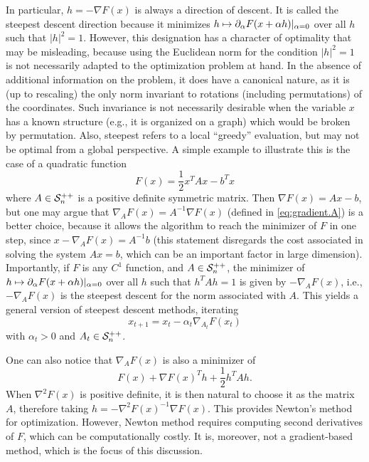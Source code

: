 In particular,  $h = -\nabla F(x)$ is always a direction of descent. It is called the steepest descent direction because it minimizes $h\mapsto \partial_\alpha F(x+\alpha h)|_{\alpha = 0}$ over all $h$ such that $|h|^2=1$. However, this designation has a character of optimality that may be misleading, because using the Euclidean norm for the condition $|h|^2 = 1$ is not necessarily adapted to the optimization problem at hand. In the absence of additional information on the problem, it does have a canonical nature, as it is (up to rescaling) the only norm invariant to rotations (including permutations) of the coordinates. Such invariance is not necessarily desirable when the variable $x$ has a known structure (e.g., it is organized on a graph) which would be broken by permutation. Also, steepest refers to a local ``greedy'' evaluation, but may not be optimal from a global perspective. A simple example to illustrate this is the case of a quadratic function
\[
F(x) = \frac12 x^T A x - b^T x
\]
where $A \in {\mathcal S}^{++}_n$ is a positive definite symmetric matrix. Then $\nabla F(x) = Ax - b$, but one may argue that $\nabla_A F(x) = A^{-1} \nabla F(x)$ (defined in \cref{eq:gradient.A}) is a better choice, because it allows the algorithm to reach the minimizer of $F$ in one step, since $x - \nabla_AF(x) = A^{-1} b$ (this statement disregards the cost associated in solving the system $Ax = b$, which can be an important factor in large dimension). Importantly, if $F$ is any $C^1$ function, and $A\in {\mathcal S}^{++}_n$, the minimizer of $h\mapsto \partial_\alpha F(x+\alpha h)|_{\alpha = 0}$ over all $h$ such that $h^TAh = 1$ is given by $-\nabla_A F(x)$, i.e., $-\nabla_A F(x)$ is the steepest descent for the norm associated with $A$. This yields a  general version of steepest descent methods, iterating
\[
x_{t+1} = x_t - \alpha_t \nabla_{A_t} F(x_t)
\]
with $\alpha_t >0$ and $A_t\in {\mathcal S}^{++}_n$.

One can also notice that $\nabla_A F(x)$ is also a minimizer of 
\[
F(x) + \nabla F(x)^Th + \frac12 h^T A h.
\]
When $\nabla^2 F(x)$ is positive definite, it is then natural to choose it as the matrix $A$, therefore taking $h = - \nabla^2 F(x)^{-1} \nabla F(x)$. This provides Newton's method for optimization. However, Newton method requires computing second derivatives of $F$, which can be computationally costly. It is, moreover, not a gradient-based method, which is the focus of this discussion.
 

%



